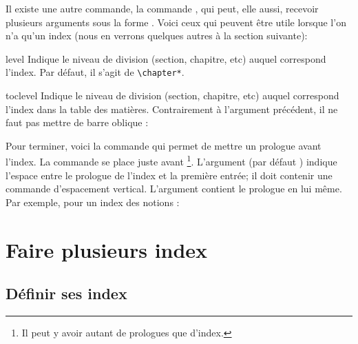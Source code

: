 Il existe une autre commande, la commande , qui peut, elle aussi, recevoir plusieurs arguments sous la forme
. Voici ceux qui peuvent être utile lorsque l'on n'a qu'un index (nous en verrons quelques autres à la section suivante):
\begin{choix}
\item[level] Indique le niveau de division (section, chapitre, etc) auquel correspond l'index. Par défaut, il s'agit de \verb|\chapter*|.
\item[toclevel] Indique le niveau de division (section, chapitre, etc) auquel correspond l'index dans la table des matières.  Contrairement à l'argument précédent, il ne faut pas mettre de barre oblique :

\begin{latexcode}
\indexsetup[level=\section*, toclevel=section]
\end{latexcode}
\end{choix}


Pour terminer, voici la commande  qui permet de mettre un prologue avant l'index. La commande se place juste avant \footnote{Il peut y avoir autant de prologues que d'index.}. L'argument  (par défaut ) indique l'espace   entre le prologue de l'index et la première entrée; il doit contenir  une commande d'espacement vertical. L'argument  contient le prologue en lui même. Par exemple, pour un index des notions :

\begin{latexcode}
\printindex
\end{latexcode}


\section{Faire plusieurs index}\label{multiindex}


\subsection{Définir ses index}

